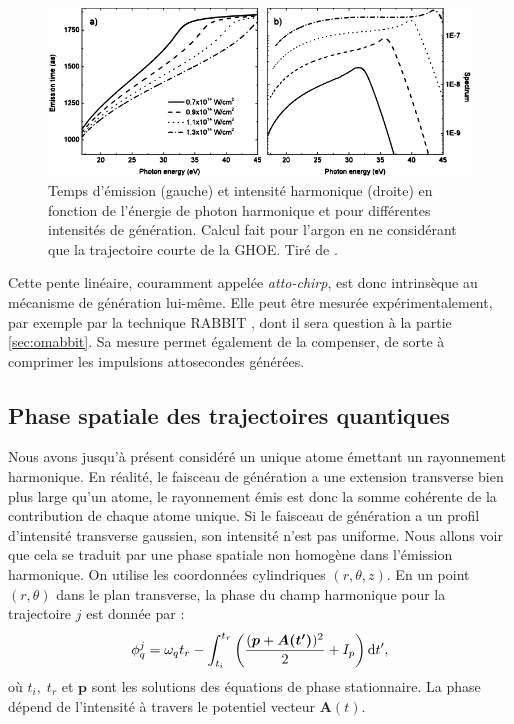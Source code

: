 \begin{figure}[!ht]
\centering
\includegraphics[width=0.8\columnwidth]{Figures/ThreeStep/gdd_argon.pdf}%
\caption{Temps d’émission (gauche) et intensité harmonique (droite) en fonction de l’énergie de photon harmonique et pour différentes intensités de génération. Calcul fait pour l’argon en ne considérant que la trajectoire courte de la GHOE. Tiré de .}
\label{fig:diveki}
\end{figure}

Cette pente linéaire, couramment appelée \textit{atto-chirp}, est donc intrinsèque au mécanisme de génération lui-même. Elle peut être mesurée expérimentalement, par exemple par la technique RABBIT , dont il sera question à la partie \ref{sec:omabbit}. Sa mesure permet également de la compenser, de sorte à comprimer les impulsions attosecondes générées.

\subsection{Phase spatiale des trajectoires quantiques}
\label{sec:phase_spatiale}
Nous avons jusqu'à présent considéré un unique atome émettant un rayonnement harmonique. En réalité, le faisceau de génération a une extension transverse bien plus large qu'un atome, le rayonnement émis est donc la somme cohérente de la contribution de chaque atome unique. Si le faisceau de génération a un profil d'intensité transverse gaussien, son intensité n'est pas uniforme. Nous allons voir que cela se traduit par une phase spatiale non homogène dans l'émission harmonique. On utilise les coordonnées cylindriques $(r,\theta,z)$. En un point $(r,\theta)$ dans le plan transverse, la phase du champ harmonique pour la trajectoire $j$ est donnée par :
\begin{equation}
\phi^j_q = \omega_q t_r - \int_{t_i}^{t_r}\left(\frac{({\bm{p}+\bm{A(t')}})^2}{2}+I_p\right)\mathrm{d} t',
\end{equation} 
où $t_i,\;t_r$ et $\bm{p}$ sont les solutions des équations de phase stationnaire. La phase dépend de l'intensité à travers le potentiel vecteur $\bm{A}(t)$. 

